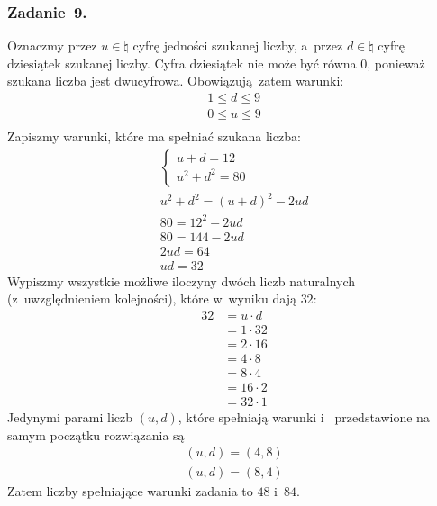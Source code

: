 \subsubsection*{Zadanie~9.}
Oznaczmy przez \(u \in \natural\) cyfrę jedności szukanej liczby, a~przez \(d \in \natural\) cyfrę dziesiątek szukanej liczby. Cyfra dziesiątek nie może być równa \(0\), ponieważ szukana liczba jest dwucyfrowa. Obowiązują zatem warunki:
\begin{gather*}
    \tag{\(\star\)} 1 \leq d \leq 9 \label{2020_09_28:9:decimal}\\
    \tag{\(\ast\)} 0 \leq u \leq 9 \label{2020_09_28:9:unit}\\
\end{gather*}
Zapiszmy warunki, które ma spełniać szukana liczba:
\begin{gather*}
    \begin{cases}
        u + d = 12\\
        u^2 + d^2 = 80
    \end{cases}\\
    u^2 + d^2 = (u + d)^2 - 2ud\\
    80 = 12^2 - 2ud\\
    80 = 144 - 2ud\\
    2ud = 64\\
    ud = 32
\end{gather*}
Wypiszmy wszystkie możliwe iloczyny dwóch liczb naturalnych (z~uwzględnieniem kolejności), które w~wyniku dają \(32\):
\begin{equation*}
    \begin{split}
        32 &= u \cdot d\\
        &= 1 \cdot 32\\
        &= 2 \cdot 16\\
        &= 4 \cdot 8\\
        &= 8 \cdot 4\\
        &= 16 \cdot 2\\
        &= 32 \cdot 1
    \end{split}
\end{equation*}
Jedynymi parami liczb \((u, d)\), które spełniają warunki  i~ przedstawione na samym początku rozwiązania są
\begin{gather*}
    (u, d) = (4, 8)\\
    (u, d) = (8, 4)
\end{gather*}
Zatem liczby spełniające warunki zadania to \(48\) i~\(84\).
